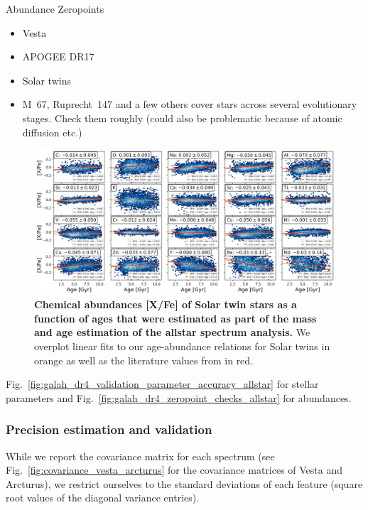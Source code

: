 \documentclass[
  journal=pasa,
  manuscript=research-paper, %
  year=2024,
  volume=37
]{cup-journal}
\begin{document}
Abundance Zeropoints
\begin{itemize}
    \item Vesta
    \item APOGEE DR17
    \item Solar twins
    \item  M~67, Ruprecht~147 and a few others cover stars across several evolutionary stages. Check them roughly (could also be problematic because of atomic diffusion etc.)
\end{itemize}




\begin{figure}[ht]
 \centering
 \includegraphics[width=\textwidth]{figures/galah_dr4_age_xfe_trends_solar_twins_allstar.png}
 \caption{\textbf{Chemical abundances [X/Fe] of Solar twin stars as a function of ages that were estimated as part of the mass and age estimation of the allstar spectrum analysis.} We overplot linear fits to our age-abundance relations for Solar twins in orange as well as the literature values from \citet{Bedell2018} in red.}
 \label{fig:galah_dr4_age_xfe_trends_solar_twins_allstar}
\end{figure}

Fig.~\ref{fig:galah_dr4_validation_parameter_accuracy_allstar} for stellar parameters and Fig.~\ref{fig:galah_dr4_zeropoint_checks_allstar} for abundances.









\subsubsection{Precision estimation and validation} \label{sec:uncertainty_precision}

While we report the covariance matrix for each spectrum (see Fig.~\ref{fig:covariance_vesta_arcturus} for the covariance matrices of Vesta and Arcturus), we restrict ourselves to the standard deviations of each feature (square root values of the diagonal variance entries).
\end{document}
